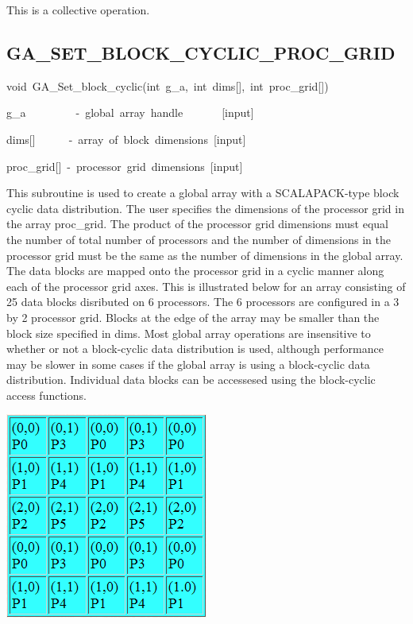 This is a collective operation. 


\subsection*{\label{sub:GA_SET_BLOCK_CYCLIC_PROC_GRID}GA\_SET\_BLOCK\_CYCLIC\_PROC\_GRID}
\begin{lyxcode}
void~GA\_Set\_block\_cyclic(int~g\_a,~int~dims{[}{]},~int~proc\_grid{[}{]})



g\_a~~~~~~~~~-~global~array~handle~~~~~~~{[}input{]}~

dims{[}{]}~~~~~~-~array~of~block~dimensions~{[}input{]}~

proc\_grid{[}{]}~-~processor~grid~dimensions~{[}input{]}
\end{lyxcode}
This subroutine is used to create a global array with a SCALAPACK-type
block cyclic data distribution. The user specifies the dimensions
of the processor grid in the array proc\_grid. The product of the
processor grid dimensions must equal the number of total number of
processors and the number of dimensions in the processor grid must
be the same as the number of dimensions in the global array. The data
blocks are mapped onto the processor grid in a cyclic manner along
each of the processor grid axes. This is illustrated below for an
array consisting of 25 data blocks disributed on 6 processors. The
6 processors are configured in a 3 by 2 processor grid. Blocks at
the edge of the array may be smaller than the block size specified
in dims. Most global array operations are insensitive to whether or
not a block-cyclic data distribution is used, although performance
may be slower in some cases if the global array is using a block-cyclic
data distribution. Individual data blocks can be accessesed using
the block-cyclic access functions.

\includegraphics{Set_Block_Cyclic_Proc_Grid}

